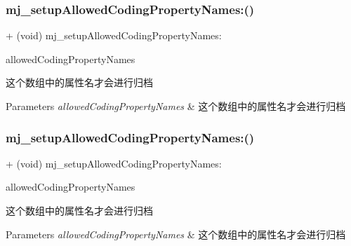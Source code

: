 \subsubsection{\texorpdfstring{mj\+\_\+setup\+Allowed\+Coding\+Property\+Names\+:()}{mj\_setupAllowedCodingPropertyNames:()}\hspace{0.1cm}{\footnotesize\ttfamily [2/3]}}
{\footnotesize\ttfamily + (void) mj\+\_\+setup\+Allowed\+Coding\+Property\+Names\+: \begin{DoxyParamCaption}\item[{(M\+J\+Allowed\+Coding\+Property\+Names)}]{allowed\+Coding\+Property\+Names }\end{DoxyParamCaption}}

这个数组中的属性名才会进行归档


\begin{DoxyParams}{Parameters}
{\em allowed\+Coding\+Property\+Names} & 这个数组中的属性名才会进行归档 \\
\hline
\end{DoxyParams}
\mbox{\label{category_n_s_object_07_m_j_class_08_a8b463753f75f643f380cfe86d7223b2d}} 
\subsubsection{\texorpdfstring{mj\+\_\+setup\+Allowed\+Coding\+Property\+Names\+:()}{mj\_setupAllowedCodingPropertyNames:()}\hspace{0.1cm}{\footnotesize\ttfamily [3/3]}}
{\footnotesize\ttfamily + (void) mj\+\_\+setup\+Allowed\+Coding\+Property\+Names\+: \begin{DoxyParamCaption}\item[{(M\+J\+Allowed\+Coding\+Property\+Names)}]{allowed\+Coding\+Property\+Names }\end{DoxyParamCaption}}

这个数组中的属性名才会进行归档


\begin{DoxyParams}{Parameters}
{\em allowed\+Coding\+Property\+Names} & 这个数组中的属性名才会进行归档 \\
\hline
\end{DoxyParams}
\mbox{\label{category_n_s_object_07_m_j_class_08_a8a14f8d0e4307834475f58536240810f}} 
